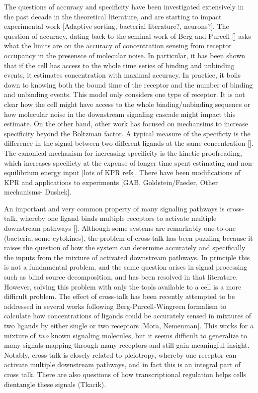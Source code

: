 \documentclass[prl,showpacs]{revtex4}
\begin{document}
The questions of accuracy and specificity have been investigated extensively in the past decade in the theoretical literature, and are starting to impact experimental work [Adaptive sorting, bacterial literature?, neurons?]. The question of accuracy, dating back to the seminal work of Berg and Purcell [] asks what the limits are on the accuracy of concentration sensing from receptor occupancy in the presensce of molecular noise. In particular, it has been shown that if the cell has access to the whole time series of binding and unbinding events, it estimates concentration with maximal accuracy. In practice, it boils down to knowing both the bound time of the receptor and the number of binding and unbinding events. This model only considers one type of receptor. It is not clear how the cell might have access to the whole binding/unbinding sequence or how molecular noise in the downstream signaling cascade might impact this estimate. On the other hand, other work has focused on mechansims to increase specificity beyond the Boltzman factor. A typical measure of the specificty is the difference in the signal between two different ligands at the same concentration []. The canonical mechanism for increasing specificity is the kinetic proofreading, which increases specificty at the expense of longer time spent estimating and non-equilibrium energy input [lots of KPR refs]. There have been modifications of KPR and applications to experiments [GAB, Goldstein/Faeder, Other mechanisms- Dushek].

An important and very common property of many signaling pathways is cross-talk, whereby one ligand binds multiple receptors to activate multiple downstream pathways []. Although some systems are remarkably one-to-one (bacteria, some cytokines), the problem of cross-talk has been puzzling because it raises the question of how the system can determine accurately and specifically the inputs from the mixture of activated downstream pathways. In principle this is not a fundamental problem, and the same question arises in signal processing such as blind source decomposition, and has been resolved in that literature. However, solving this problem with only the tools available to a cell is a more difficult problem. The effect of cross-talk has been recently attempted to be addressed in several works following Berg-Purcell-Wingreen formalism to calculate how concentrations of ligands could be accurately sensed in mixtures of two ligands by either single or two receptors [Mora, Nemenman]. This works for a mixture of \emph{two} known signaling molecules, but it seems difficult to generalize to many signals mapping through many receptors and still gain meaningful insight. Notably, cross-talk is closely related to pleiotropy, whereby one receptor can activate multiple downstream pathways, and in fact this is an integral part of cross talk. There are also questions of how transcriptional regulation helps cells dientangle these signals (Tkacik).
\end{document}
